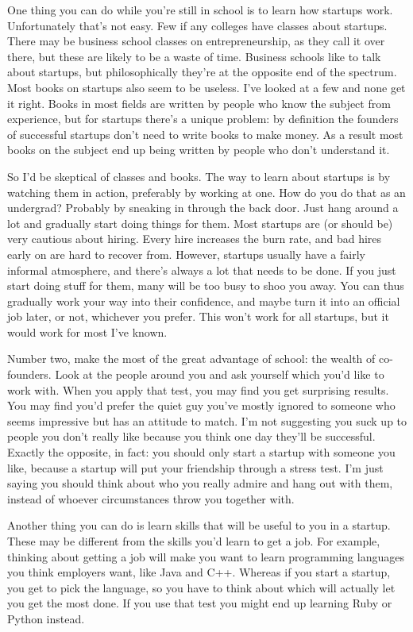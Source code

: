 One thing you can do while you're still in school is to learn how
startups work. Unfortunately that's not easy. Few if any colleges have
classes about startups. There may be business school classes on
entrepreneurship, as they call it over there, but these are likely to be
a waste of time. Business schools like to talk about startups, but
philosophically they're at the opposite end of the spectrum. Most books
on startups also seem to be useless. I've looked at a few and none get
it right. Books in most fields are written by people who know the
subject from experience, but for startups there's a unique problem: by
definition the founders of successful startups don't need to write books
to make money. As a result most books on the subject end up being
written by people who don't understand it.

So I'd be skeptical of classes and books. The way to learn about
startups is by watching them in action, preferably by working at one.
How do you do that as an undergrad? Probably by sneaking in through the
back door. Just hang around a lot and gradually start doing things for
them. Most startups are (or should be) very cautious about hiring. Every
hire increases the burn rate, and bad hires early on are hard to recover
from. However, startups usually have a fairly informal atmosphere, and
there's always a lot that needs to be done. If you just start doing
stuff for them, many will be too busy to shoo you away. You can thus
gradually work your way into their confidence, and maybe turn it into an
official job later, or not, whichever you prefer. This won't work for
all startups, but it would work for most I've known.

Number two, make the most of the great advantage of school: the wealth
of co-founders. Look at the people around you and ask yourself which
you'd like to work with. When you apply that test, you may find you get
surprising results. You may find you'd prefer the quiet guy you've
mostly ignored to someone who seems impressive but has an attitude to
match. I'm not suggesting you suck up to people you don't really like
because you think one day they'll be successful. Exactly the opposite,
in fact: you should only start a startup with someone you like, because
a startup will put your friendship through a stress test. I'm just
saying you should think about who you really admire and hang out with
them, instead of whoever circumstances throw you together with.

Another thing you can do is learn skills that will be useful to you in a
startup. These may be different from the skills you'd learn to get a
job. For example, thinking about getting a job will make you want to
learn programming languages you think employers want, like Java and C++.
Whereas if you start a startup, you get to pick the language, so you
have to think about which will actually let you get the most done. If
you use that test you might end up learning Ruby or Python instead.

